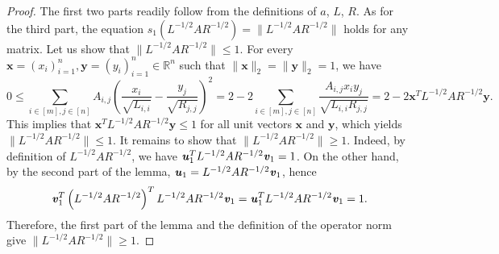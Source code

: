 \documentclass[reqno,a4paper]{amsart}
\newtheorem{theorem}{Theorem}[section]
\theoremstyle{definition}
\begin{document}
\begin{proof} 
The first two parts readily follow from the definitions of $a$, $L$, $R$.
As for the third part, the equation $s_1(L^{-1/2}AR^{-1/2}) = \|{L^{-1/2}AR^{-1/2}}\|$ holds for any matrix. Let us show that $\|L^{-1/2}AR^{-1/2}\|\le 1$. For every $\textbf{x}=(x_i)_{i=1}^n,\textbf{y}=(y_i)_{i=1}^n\in \mathbb{R}^n$ such that $\|\textbf{x}\|_2=\|\textbf{y}\|_2=1$, we have
\[0\le \sum_{i\in [m], j \in[n]}A_{i,j}\left(\frac{x_i}{\sqrt{L_{i,i}}}-\frac{y_j}{\sqrt{R_{j,j}}}\right)^2=2-2\sum_{i\in [m], j \in[n]}\frac{A_{i,j}x_iy_j}{\sqrt{L_{i,i}R_{j,j}}}=2-2\textbf{x}^T L^{-1/2}AR^{-1/2} \textbf{y}.\]
This implies that $\textbf{x}^T L^{-1/2}AR^{-1/2} \textbf{y}\le 1$ for all unit vectors $\textbf{x}$ and $\textbf{y}$, which yields $\|L^{-1/2}AR^{-1/2}\|\le 1$. It remains to show that $\|L^{-1/2}AR^{-1/2}\|\ge 1$. Indeed, by definition of $L^{-1/2}AR^{-1/2}$, we have $\text{\textbf{\textit{u}}}_1^T L^{-1/2}AR^{-1/2} \text{\textbf{\textit{v}}}_1=1$. On the other hand, by the second part of the lemma, $\text{\textbf{\textit{u}}}_1=L^{-1/2}AR^{-1/2} \text{\textbf{\textit{v}}}_1$, hence
\[
\text{\textbf{\textit{v}}}_1^T \left(L^{-1/2}AR^{-1/2}\right)^T L^{-1/2}AR^{-1/2} \text{\textbf{\textit{v}}}_1=\text{\textbf{\textit{u}}}_1^T L^{-1/2}AR^{-1/2} \text{\textbf{\textit{v}}}_1=1.
\]
Therefore, the first part of the lemma and the definition of the operator norm give $\|{L^{-1/2}AR^{-1/2}}\| \ge 1$.
\end{proof}

\end{document}
